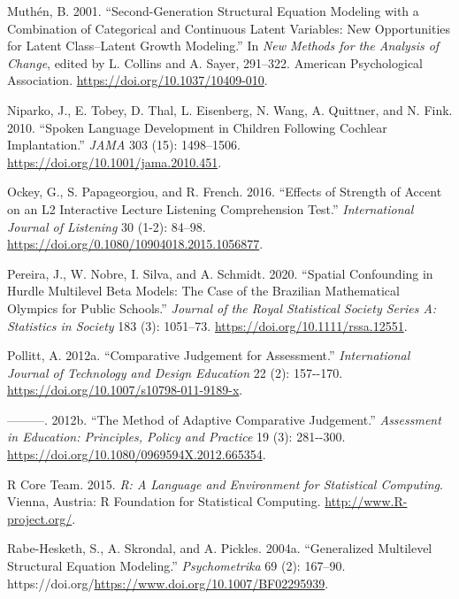 \documentclass[
sn-apacite
]{sn-jnl}
\newlength{\cslhangindent}
\newenvironment{CSLReferences}[2] %
 {\begin{list}{}{%
  \setlength{\itemindent}{0pt}
  \setlength{\leftmargin}{0pt}
  \setlength{\parsep}{0pt}
  \ifodd #1
   \setlength{\leftmargin}{\cslhangindent}
   \setlength{\itemindent}{-1\cslhangindent}
  \fi
  \setlength{\itemsep}{#2\baselineskip}}}
 {\end{list}}
\begin{document}
\begin{CSLReferences}{1}{0}
Muthén, B. 2001. {``Second-Generation Structural Equation Modeling with
a Combination of Categorical and Continuous Latent Variables: New
Opportunities for Latent Class--Latent Growth Modeling.''} In \emph{New
Methods for the Analysis of Change}, edited by L. Collins and A. Sayer,
291--322. American Psychological Association.
\url{https://doi.org/10.1037/10409-010}.

Niparko, J., E. Tobey, D. Thal, L. Eisenberg, N. Wang, A. Quittner, and
N. Fink. 2010. {``Spoken Language Development in Children Following
Cochlear Implantation.''} \emph{JAMA} 303 (15): 1498--1506.
\url{https://doi.org/10.1001/jama.2010.451}.

Ockey, G., S. Papageorgiou, and R. French. 2016. {``Effects of Strength
of Accent on an L2 Interactive Lecture Listening Comprehension Test.''}
\emph{International Journal of Listening} 30 (1-2): 84--98.
\url{https://doi.org/0.1080/10904018.2015.1056877}.

Pereira, J., W. Nobre, I. Silva, and A. Schmidt. 2020. {``Spatial
Confounding in Hurdle Multilevel Beta Models: The Case of the Brazilian
Mathematical Olympics for Public Schools.''} \emph{Journal of the Royal
Statistical Society Series A: Statistics in Society} 183 (3): 1051--73.
\url{https://doi.org/10.1111/rssa.12551}.

Pollitt, A. 2012a. {``Comparative Judgement for Assessment.''}
\emph{International Journal of Technology and Design Education} 22 (2):
157-\/-170. \url{https://doi.org/10.1007/s10798-011-9189-x}.

---------. 2012b. {``The Method of Adaptive Comparative Judgement.''}
\emph{Assessment in Education: Principles, Policy and Practice} 19 (3):
281-\/-300. \url{https://doi.org/10.1080/0969594X.2012.665354}.

R Core Team. 2015. \emph{R: A Language and Environment for Statistical
Computing}. Vienna, Austria: R Foundation for Statistical Computing.
\url{http://www.R-project.org/}.

Rabe-Hesketh, S., A. Skrondal, and A. Pickles. 2004a. {``Generalized
Multilevel Structural Equation Modeling.''} \emph{Psychometrika} 69 (2):
167--90. https://doi.org/\url{https://www.doi.org/10.1007/BF02295939}.


\end{CSLReferences}
\end{document}
